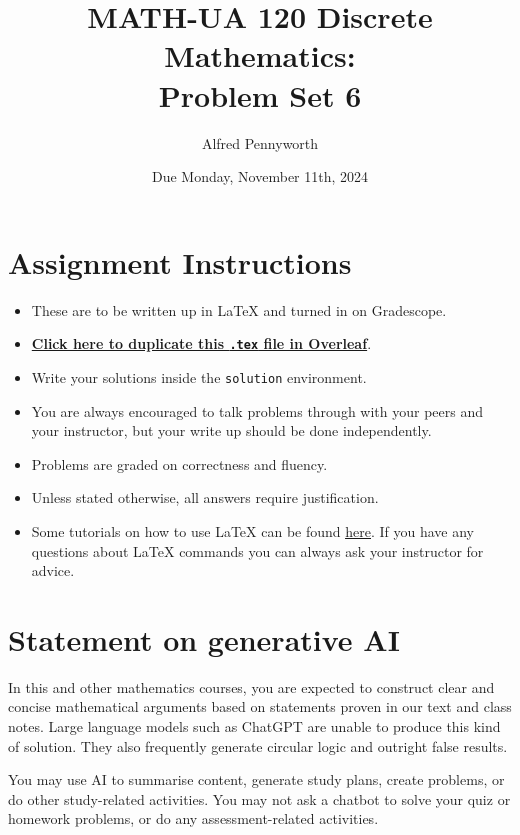 \documentclass{article}
\title{\textbf{MATH-UA 120 Discrete Mathematics: \\ Problem Set 6}}
\author{%
    Alfred Pennyworth %
}
\date{Due Monday, November 11th, 2024} %
\theoremstyle{definition}
\begin{document}
\maketitle %

\vfill

\section*{Assignment Instructions}

\begin{itemize}
    \item These are to be written up in \LaTeX{} and turned in on Gradescope.
    \item \href{https://bit.ly/3AWJyvt}{\textbf{Click here to duplicate this \texttt{.tex} file in Overleaf}}.
    \item Write your solutions inside the \texttt{solution} environment.
    \item You are always encouraged to talk problems through with your peers and your instructor, but your write up should be done independently.
    \item Problems are graded on correctness and fluency.
    \item Unless stated otherwise, all answers require justification.
    \item Some tutorials on how to use \LaTeX{} can be found \href{https://www.overleaf.com/learn/latex/Tutorials}{\underline{here}}. If you have any questions about \LaTeX{} commands you can always ask your instructor for advice.
\end{itemize}

\vfill

\section*{Statement on generative AI}

In this and other mathematics courses, you are expected to construct clear and concise mathematical arguments based on statements proven in our text and class notes. Large language models such as ChatGPT are unable to produce this kind of solution. They also frequently generate circular logic and outright false results.
 
You may use AI to summarise content, generate study plans, create problems, or do other study-related activities. You may not ask a chatbot to solve your quiz or homework problems, or do any assessment-related activities.
 
\end{document}
